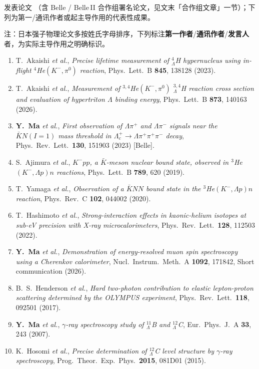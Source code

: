 \documentclass[a4paper,11pt,fontset=none]{ctexart}
\begin{document}
{\small 发表论文 （含 Belle / Belle\,II 合作组署名论文，见文末「合作组文章」一节）；下列为第一/通讯作者或起主导作用的代表性成果。}

{\small\color{impgray} 注：日本强子物理论文多按姓氏字母排序，下列标注\textbf{第一作者}/\textbf{通讯作者}/\textbf{发言人}者，为实际主导作用之明确标识。}

{\small
\begin{enumerate}\setlength{\itemsep}{2pt}
  \item T.~Akaishi \textit{et al.}, \textit{Precise lifetime measurement of $^{4}_{\Lambda}$H hypernucleus using in-flight $^{4}$He$(K^{-},\pi^{0})$ reaction}, Phys.\ Lett.\ B \textbf{845}, 138128 (2023). 
  \item T.~Akaishi \textit{et al.}, \textit{Measurement of $^{3,4}$He$(K^-,\pi^0)$ $^{3,4}_{\Lambda}$H reaction cross section and evaluation of hypertriton $\Lambda$ binding energy}, Phys.\ Lett.\ B \textbf{873}, 140163 (2026). 
  \item \textbf{Y.~Ma} \textit{et al.}, \textit{First observation of $\Lambda\pi^+$ and $\Lambda\pi^-$ signals near the $\bar{K}N(I{=}1)$ mass threshold in $\Lambda_c^+\!\to\Lambda\pi^+\pi^+\pi^-$ decay}, Phys.\ Rev.\ Lett.\ \textbf{130}, 151903 (2023) [Belle]. 
  \item S.~Ajimura \textit{et al.}, \textit{$K^-pp$, a $\bar{K}$-meson nuclear bound state, observed in $^3$He$(K^-,\Lambda p)n$ reactions}, Phys.\ Lett.\ B \textbf{789}, 620 (2019). 
  \item T.~Yamaga \textit{et al.}, \textit{Observation of a $\bar{K}NN$ bound state in the $^3$He$(K^-,\Lambda p)n$ reaction}, Phys.\ Rev.\ C \textbf{102}, 044002 (2020). 
  \item T.~Hashimoto \textit{et al.}, \textit{Strong-interaction effects in kaonic-helium isotopes at sub-eV precision with X-ray microcalorimeters}, Phys.\ Rev.\ Lett.\ \textbf{128}, 112503 (2022). 
  \item \textbf{Y.~Ma} \textit{et al.}, \textit{Demonstration of energy-resolved muon spin spectroscopy using a Cherenkov calorimeter}, Nucl.\ Instrum.\ Meth.\ A \textbf{1092}, 171842, Short communication (2026). 
  \item B.~S.~Henderson \textit{et al.}, \textit{Hard two-photon contribution to elastic lepton-proton scattering determined by the OLYMPUS experiment}, Phys.\ Rev.\ Lett.\ \textbf{118}, 092501 (2017). 
  \item \textbf{Y.~Ma} \textit{et al.}, \textit{$\gamma$-ray spectroscopy study of $^{11}_{\Lambda}$B and $^{12}_{\Lambda}$C}, Eur.\ Phys.\ J.\ A \textbf{33}, 243 (2007). 
  \item K.~Hosomi \textit{et al.}, \textit{Precise determination of $^{12}_{\Lambda}$C level structure by $\gamma$-ray spectroscopy}, Prog.\ Theor.\ Exp.\ Phys.\ \textbf{2015}, 081D01 (2015). 
\end{enumerate}
}
\end{document}
